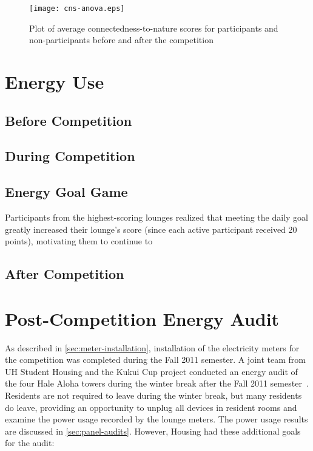\begin{figure}[htbp]
	\centering
		\texttt{[image: cns-anova.eps]}
		\caption[Plot of CNS results before and after competition]{Plot of average connectedness-to-nature scores for participants and non-participants before and after the competition}
\label{fig:cns-anova}
\end{figure}


\section{Energy Use}


\subsection{Before Competition}


\subsection{During Competition}

\subsection{Energy Goal Game}

Participants from the highest-scoring lounges realized that meeting the daily goal greatly increased their lounge's score (since each active participant received 20 points), motivating them to continue to 

\subsection{After Competition}








\section{Post-Competition Energy Audit}
\label{sec:post-energy-audit}

As described in \autoref{sec:meter-installation}, installation of the electricity meters for the competition was completed during the Fall 2011 semester. A joint team from UH \Manoa Student Housing and the Kukui Cup project conducted an energy audit of the four Hale Aloha towers during the winter break after the Fall 2011 semester~\cite{csdl2-11-12}. Residents are not required to leave during the winter break, but many residents do leave, providing an opportunity to unplug all devices in resident rooms and examine the power usage recorded by the lounge meters. The power usage results are discussed in \autoref{sec:panel-audits}. However, Housing had these additional goals for the audit:

